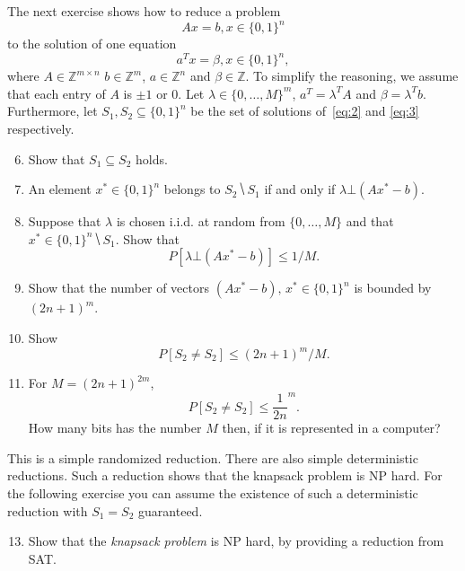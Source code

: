 \documentclass[11pt,a4paper]{article}
\begin{document}
\newpage

\noindent 
The next exercise shows how to reduce a problem 
\begin{equation} 
  \label{eq:2}
  A x = b, x ∈ \{0,1\}^n   
\end{equation}
to the solution of one equation
\begin{equation}
  \label{eq:3}
   a^T x = β, x ∈ \{0,1\}^n,   
 \end{equation}
 where $A ∈ℤ^{m ×n}$ $b ∈ℤ^m$, $a ∈ℤ^n$ and $β ∈ℤ$. To simplify the reasoning, we assume that each entry of $A$ is $± 1$ or $0$.
 Let $λ ∈ \{ 0,\dots,M\} ^m$,  $a^T = λ^T A$ and $β = λ^T b$. Furthermore, let $S_1, S_2 ⊆ \{0,1\}^n$ be the set of solutions  of~\eqref{eq:2} and \eqref{eq:3} respectively.

 
 \begin{enumerate}
   \setcounter{enumi}{5}
 \item  Show that $S_1 ⊆ S_2$ holds.
 \item An element $x^* ∈ \{0,1\}^n$ belongs to $S_2 ⧹S_1$ if and only if $λ ⊥ (A x^* -b)$.
 \item Suppose that $λ $ is chosen i.i.d. at random from $\{ 0,\dots,M\}$ and that $x^* ∈ \{0,1\}^n ⧹S_1$. Show that
   \begin{displaymath}
     P\left[ λ ⊥ (A x^* -b) \right] ≤ 1/M. 
   \end{displaymath}
 \item Show that the number of vectors $(A x^* -b), \, x^* ∈\{0,1\}^n$ is bounded by $(2 n +1)^m$.
 \item Show 
   \begin{displaymath}
     P \left[ S_2 ≠ S_2\right] ≤ (2 n +1)^m / M. 
   \end{displaymath}
 \item For $M = (2 n +1)^{2m}$,
   \begin{displaymath}
     P \left[ S_2 ≠ S_2\right] ≤ \frac{1}{2n}^m. 
   \end{displaymath}
   How many bits has the number $M$ then, if it is represented in a computer?
   \end{enumerate}

 \noindent 
 This is a simple randomized reduction. There are also simple deterministic reductions. Such a reduction shows that the knapsack problem is NP hard. For the following exercise you can assume the existence of such a deterministic reduction with $S_1 = S_2$ guaranteed.
 \begin{enumerate}
   \setcounter{enumi}{12}
\item    Show that the \emph{knapsack problem} is NP hard, by providing a reduction from SAT. 
 \end{enumerate}
 
 

%
%


 
\end{document}
